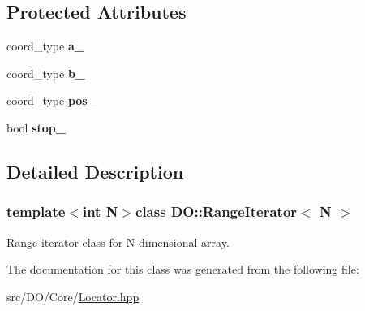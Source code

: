 \subsection*{Protected Attributes}
\begin{DoxyCompactItemize}
\item 
\hypertarget{class_d_o_1_1_range_iterator_a284f00bbffebe7c1c4dfb317312708b6}{coord\-\_\-type {\bfseries a\-\_\-}}\label{class_d_o_1_1_range_iterator_a284f00bbffebe7c1c4dfb317312708b6}

\item 
\hypertarget{class_d_o_1_1_range_iterator_a08f8d2c104cdd1d188ed6c12f1a01a83}{coord\-\_\-type {\bfseries b\-\_\-}}\label{class_d_o_1_1_range_iterator_a08f8d2c104cdd1d188ed6c12f1a01a83}

\item 
\hypertarget{class_d_o_1_1_range_iterator_a0eb23f46bbde2be398f3e8b639f4eb2f}{coord\-\_\-type {\bfseries pos\-\_\-}}\label{class_d_o_1_1_range_iterator_a0eb23f46bbde2be398f3e8b639f4eb2f}

\item 
\hypertarget{class_d_o_1_1_range_iterator_adc52b9a89f713950bde219e658905261}{bool {\bfseries stop\-\_\-}}\label{class_d_o_1_1_range_iterator_adc52b9a89f713950bde219e658905261}

\end{DoxyCompactItemize}


\subsection{Detailed Description}
\subsubsection*{template$<$int N$>$class D\-O\-::\-Range\-Iterator$<$ N $>$}

Range iterator class for N-\/dimensional array. 

The documentation for this class was generated from the following file\-:\begin{DoxyCompactItemize}
\item 
src/\-D\-O/\-Core/\hyperlink{_locator_8hpp}{Locator.\-hpp}\end{DoxyCompactItemize}
